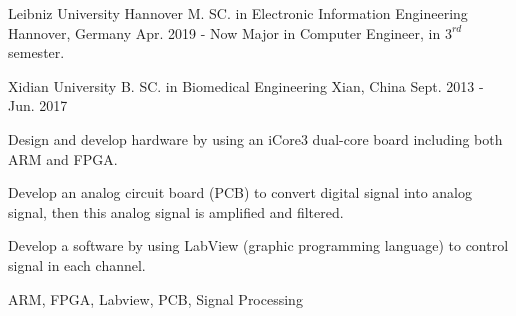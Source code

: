 

\begin{cventries}

	\cventry
	{Leibniz University Hannover} %
	{M. SC. in Electronic Information Engineering} %
	{Hannover, Germany} %
	{Apr. 2019 - Now} %
	{Major in Computer Engineer, in $3^{rd}$ semester.}
	{}

  \cventry
  	{Xidian University} %
    {B. SC. in Biomedical Engineering} %
    {Xian, China} %
    {Sept. 2013 - Jun. 2017} %
    {
      \begin{cvitems} %
        \item {Design and develop hardware by using an iCore3 dual-core board including both ARM and FPGA.}
        \item {Develop an analog circuit board (PCB) to convert digital signal into analog signal, then this analog signal is amplified and filtered.}
        \item {Develop a software by using LabView (graphic programming language) to control signal in each channel.}
      \end{cvitems}
    }
	{ARM, FPGA, Labview, PCB, Signal Processing}

	\vspace{-2.0mm}

\end{cventries}

